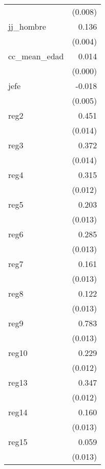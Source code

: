 {\begin{longtable}{l*{1}{D{.}{.}{-1}}}
            &     (0.008)         \\
\addlinespace
jj\_hombre   &       0.136\sym{***}\\
            &     (0.004)         \\
\addlinespace
cc\_mean\_edad&       0.014\sym{***}\\
            &     (0.000)         \\
\addlinespace
jefe        &      -0.018\sym{***}\\
            &     (0.005)         \\
\addlinespace
reg2        &       0.451\sym{***}\\
            &     (0.014)         \\
\addlinespace
reg3        &       0.372\sym{***}\\
            &     (0.014)         \\
\addlinespace
reg4        &       0.315\sym{***}\\
            &     (0.012)         \\
\addlinespace
reg5        &       0.203\sym{***}\\
            &     (0.013)         \\
\addlinespace
reg6        &       0.285\sym{***}\\
            &     (0.013)         \\
\addlinespace
reg7        &       0.161\sym{***}\\
            &     (0.013)         \\
\addlinespace
reg8        &       0.122\sym{***}\\
            &     (0.013)         \\
\addlinespace
reg9        &       0.783\sym{***}\\
            &     (0.013)         \\
\addlinespace
reg10       &       0.229\sym{***}\\
            &     (0.012)         \\
\addlinespace
reg13       &       0.347\sym{***}\\
            &     (0.012)         \\
\addlinespace
reg14       &       0.160\sym{***}\\
            &     (0.013)         \\
\addlinespace
reg15       &       0.059\sym{***}\\
            &     (0.013)         \\

\end{longtable}}
